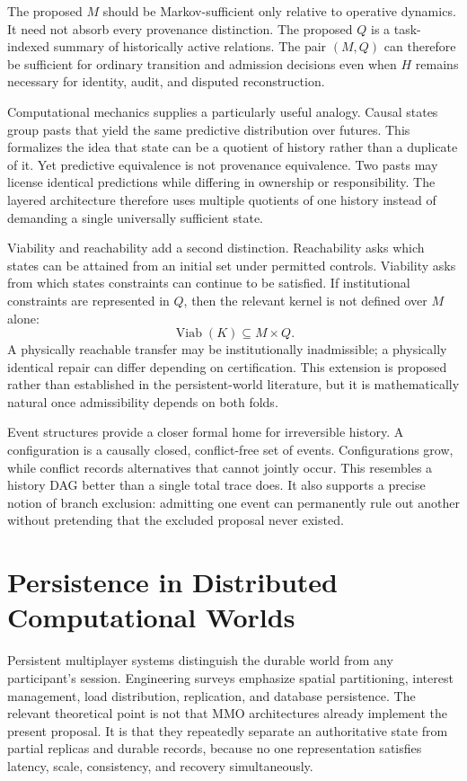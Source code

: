 \documentclass[11pt]{article}
\newcommand{\Viab}{\operatorname{Viab}}
\begin{document}
The proposed $M$ should be Markov-sufficient only relative to operative dynamics. It need not absorb every provenance distinction. The proposed $Q$ is a task-indexed summary of historically active relations. The pair $(M,Q)$ can therefore be sufficient for ordinary transition and admission decisions even when $H$ remains necessary for identity, audit, and disputed reconstruction.

Computational mechanics supplies a particularly useful analogy. Causal states group pasts that yield the same predictive distribution over futures. This formalizes the idea that state can be a quotient of history rather than a duplicate of it. Yet predictive equivalence is not provenance equivalence. Two pasts may license identical predictions while differing in ownership or responsibility. The layered architecture therefore uses multiple quotients of one history instead of demanding a single universally sufficient state.

Viability and reachability add a second distinction. Reachability asks which states can be attained from an initial set under permitted controls. Viability asks from which states constraints can continue to be satisfied. If institutional constraints are represented in $Q$, then the relevant kernel is not defined over $M$ alone:
\[
\Viab(K)\subseteq M\times Q.
\]
A physically reachable transfer may be institutionally inadmissible; a physically identical repair can differ depending on certification. This extension is proposed rather than established in the persistent-world literature, but it is mathematically natural once admissibility depends on both folds.

Event structures provide a closer formal home for irreversible history. A configuration is a causally closed, conflict-free set of events. Configurations grow, while conflict records alternatives that cannot jointly occur. This resembles a history DAG better than a single total trace does. It also supports a precise notion of branch exclusion: admitting one event can permanently rule out another without pretending that the excluded proposal never existed.

\section{Persistence in Distributed Computational Worlds}

Persistent multiplayer systems distinguish the durable world from any participant's session. Engineering surveys emphasize spatial partitioning, interest management, load distribution, replication, and database persistence. The relevant theoretical point is not that MMO architectures already implement the present proposal. It is that they repeatedly separate an authoritative state from partial replicas and durable records, because no one representation satisfies latency, scale, consistency, and recovery simultaneously.
\end{document}
